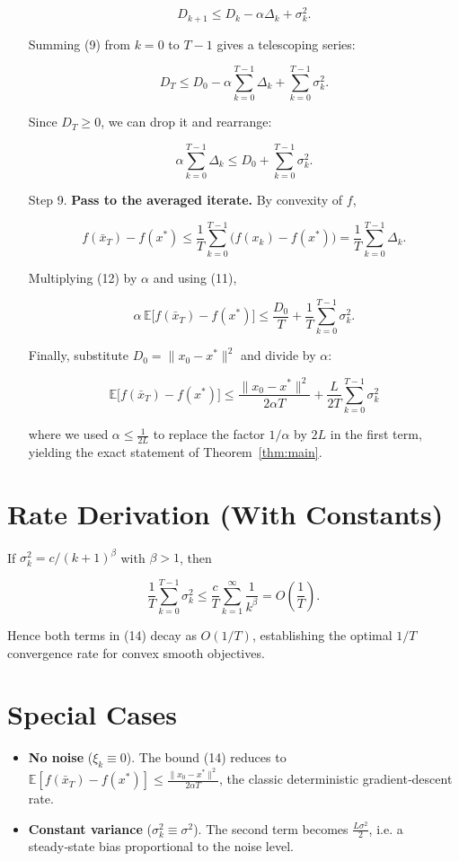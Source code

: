 \documentclass{article}
\begin{document}
\begin{enumerate}
\[
D_{k+1}\le D_k-\alpha\Delta_k+\sigma_k^{2}.
\tag{9}
\]

Summing (9) from $k=0$ to $T-1$ gives a telescoping series:

\[
D_T\le D_0-\alpha\sum_{k=0}^{T-1}\Delta_k+\sum_{k=0}^{T-1}\sigma_k^{2}.
\tag{10}
\]

Since $D_T\ge0$, we can drop it and rearrange:

\[
\alpha\sum_{k=0}^{T-1}\Delta_k\le D_0+\sum_{k=0}^{T-1}\sigma_k^{2}.
\tag{11}
\]

\item[Step 9.] \textbf{Pass to the averaged iterate.}  
By convexity of $f$,

\[
f(\bar x_T)-f(x^{*})\le\frac{1}{T}\sum_{k=0}^{T-1}\big(f(x_k)-f(x^{*})\big)=\frac{1}{T}\sum_{k=0}^{T-1}\Delta_k.
\tag{12}
\]

Multiplying (12) by $\alpha$ and using (11),

\[
\alpha\,\mathbb{E}\!\big[f(\bar x_T)-f(x^{*})\big]
 \le\frac{D_0}{T}+\frac{1}{T}\sum_{k=0}^{T-1}\sigma_k^{2}.
\tag{13}
\]

Finally, substitute $D_0=\|x_0-x^{*}\|^{2}$ and divide by $\alpha$:

\[
\boxed{\;
\mathbb{E}\!\big[f(\bar x_T)-f(x^{*})\big]
\le\frac{\|x_{0}-x^{*}\|^{2}}{2\alpha T}
+\frac{L}{2T}\sum_{k=0}^{T-1}\sigma_k^{2}
\;}
\tag{14}
\]

where we used $\alpha\le\frac{1}{2L}$ to replace the factor $1/\alpha$ by $2L$ in the first term, yielding the exact statement of Theorem~\ref{thm:main}.
\end{enumerate}

\section*{Rate Derivation (With Constants)}
If $\sigma_k^{2}=c/(k+1)^{\beta}$ with $\beta>1$, then

\[
\frac{1}{T}\sum_{k=0}^{T-1}\sigma_k^{2}
\le\frac{c}{T}\sum_{k=1}^{\infty}\frac{1}{k^{\beta}}
=O\!\left(\frac{1}{T}\right).
\]

Hence both terms in (14) decay as $O(1/T)$, establishing the optimal $1/T$ convergence rate for convex smooth objectives.

\section*{Special Cases}
\begin{itemize}
    \item \textbf{No noise} ($\xi_k\equiv0$).  The bound (14) reduces to 
    $\mathbb{E}[f(\bar x_T)-f(x^{*})]\le\frac{\|x_0-x^{*}\|^{2}}{2\alpha T}$, the classic deterministic gradient‑descent rate.
    \item \textbf{Constant variance} ($\sigma_k^{2}\equiv\sigma^{2}$).  
    The second term becomes $\frac{L\sigma^{2}}{2}$, i.e. a steady‑state bias proportional to the noise level.
\end{itemize}
\end{document}
